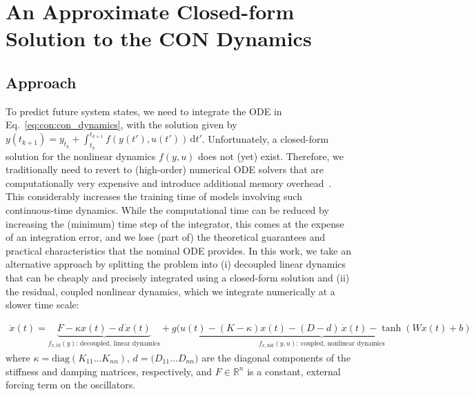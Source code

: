\section{An Approximate Closed-form Solution to the CON Dynamics}

\subsection{Approach}\label{sub:con:cfa:approach}
To predict future system states, we need to integrate the ODE in Eq.~\eqref{eq:con:con_dynamics}, with the solution given by $y(t_{k+1}) = y_{t_k} + \int_{t_k}^{t_{k+1}} f(y(t'), u(t')) \, \mathrm{d}t'$.
Unfortunately, a closed-form solution for the nonlinear dynamics $f(y, u)$ does not (yet) exist. Therefore, we traditionally need to revert to (high-order) numerical \gls{ODE} solvers that are computationally very expensive and introduce additional memory overhead~\cite{kidger2021neural}. This considerably increases the training time of models involving such continuous-time dynamics.
While the computational time can be reduced by increasing the (minimum) time step of the integrator, this comes at the expense of an integration error, and we lose (part of) the theoretical guarantees and practical characteristics that the nominal \gls{ODE} provides.
In this work, we take an alternative approach by splitting the problem into (i) decoupled linear dynamics that can be cheaply and precisely integrated using a closed-form solution and (ii) the residual, coupled nonlinear dynamics, which we integrate numerically at a slower time scale:

\begin{equation}\label{eq:con:con_split_linear_terms}
\begin{split}
    \ddot{x}(t) = \underbrace{F -\kappa x(t) - d \, \dot{x}(t)}_{f_{\ddot{x}, \mathrm{ld}}(y): \, \text{decoupled, linear dynamics}} + \underbrace{g(u(t)-(K-\kappa) x(t) - (D-d) \, \dot{x}(t) - \tanh(W x(t) + b)}_{f_{\ddot{x}, \mathrm{nld}}(y, u): \: \text{coupled, nonlinear dynamics}}
\end{split}
\end{equation}
where $\kappa = \mathrm{diag}(K_{11} \dots K_{nn})$, $d = \mathrm(D_{11} \dots D_{nn})$ are the diagonal components of the stiffness and damping matrices, respectively, and $F \in \mathbb{R}^{n}$ is a constant, external forcing term on the oscillators.

